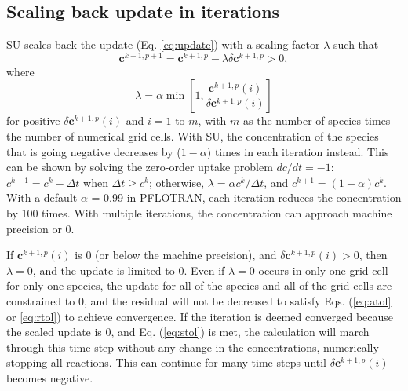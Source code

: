 \documentclass[gmd, manuscript]{copernicus}
\begin{document}
\subsection{Scaling back update in iterations}
\label{subsection:su}
SU scales back the update (Eq. \ref{eq:update}) with a scaling factor
$\lambda$ \citep{Bethke2007,Hammond2003} such that 
\begin{equation}
\mathbf{c}^{k+1,p+1}=\mathbf{c}^{k+1,p}-\lambda \delta \mathbf{c}^{k+1,p} > 0,
\label{eq:lambda}
\end{equation}
where
\begin{equation}
\lambda = \alpha \min\left[1, \frac{\mathbf{c}^{k+1,p}(i)}{\delta \mathbf{c}^{k+1,p} (i)}\right]
\label{eq:alpha}
\end{equation}
for positive $\delta \mathbf{c}^{k+1,p} (i)$ and $i=1$ to $m$, with $m$ as the
number of species times the number of numerical grid cells. With SU, the
concentration of the species that is going negative decreases by ($1-\alpha$)
times in each iteration instead. This can be shown by solving the zero-order
uptake problem $dc/dt=-1$: $c^{k+1}=c^k-\Delta t$ when $\Delta t \geq c^k$;
otherwise, $\lambda=\alpha c^k/\Delta t$, and $c^{k+1}=(1-\alpha)c^k$. With a
default $\alpha$ = 0.99 in PFLOTRAN, each iteration reduces the concentration
by 100 times. With multiple iterations, the concentration can approach machine
precision or 0.

If $\mathbf{c}^{k+1,p}(i)$ is 0 (or below the machine
precision), and $\delta \mathbf{c}^{k+1,p} (i) > 0$, then $\lambda = 0$, and the
update is limited to 0. Even if $\lambda = 0$ occurs in only one grid cell for only one
species, the update for all of the species and all of the grid cells are
constrained to 0, and the residual will not be decreased to
satisfy Eqs.
(\ref{eq:atol} or \ref{eq:rtol}) to achieve convergence.  If the iteration is
deemed converged because the scaled update is 0, and Eq. (\ref{eq:stol}) is
met, the calculation will march through this time step without any change in
the concentrations, numerically stopping all reactions. This can continue for
many time steps until $\delta \mathbf{c}^{k+1,p} (i)$ becomes negative.
 
\end{document}
